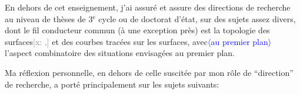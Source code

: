 \documentclass[11pt]{article}
\newcommand{\scanpage}[1]{\par\bigskip\noindent{\small\sffamily[scan #1]}\par}
\newcommand{\mspage}[1]{{\small\sffamily[p.\,#1]}}
\newcommand{\inserted}[2][]{\textcolor{blue}{$\langle$#2$\rangle$}}
\newcommand{\xout}[1]{\textcolor{gray}{[\textsf{x:} #1]}}
\begin{document}
\mspage{141}

\clearpage
\scanpage{119/142}
En dehors de cet enseignement,  j'ai assuré et assure des directions de
recherche au niveau de thèses de 3$^{\text{e}}$ cycle ou de doctorat d'état,  sur des
sujets assez divers, dont le fil conducteur commun (à une exception près)
est la topologie des surfaces\xout{,} et des courbes tracées sur les surfaces,
avec\inserted{au premier plan} l'aspect combinatoire des situations envisagées au premier plan.

Ma réflexion personnelle,  en dehors de celle suscitée par mon rôle de
``direction'' de recherche, a porté principalement sur les sujets suivants:
\end{document}
